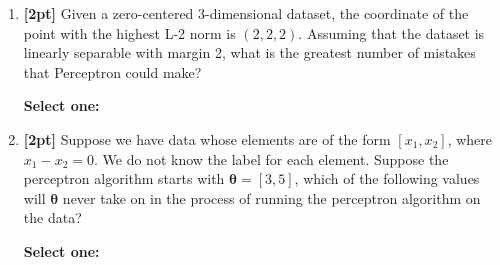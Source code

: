 \begin{enumerate}
    \item \textbf{[2pt]} Given a zero-centered 3-dimensional dataset, the coordinate of the point with the highest L-2 norm is $(2, 2, 2)$. Assuming that the dataset is linearly separable with margin 2, what is the greatest number of mistakes that Perceptron could make?

    \textbf{Select one:}

\newpage
    \item \textbf{[2pt]} Suppose we have data whose elements are of the form $[x_1,x_2]$, where $x_1 - x_2 = 0$. We do not know the label for each element. Suppose the perceptron algorithm starts with $\bm{\theta} = [3,5]$, which of the following values will $\bm{\theta}$ never take on in the process of running the perceptron algorithm on the data?

    \textbf{Select one:}
    \begin{list}{}
        \item $\circle$ $[-1,1]$
        \item $\circle$ $[4,6]$
        \item $\circle$ $[-3,-1]$
        \item $\circle$ $[5,5]$
    \end{list}


    
    

    
    

    \clearpage
\end{enumerate}
